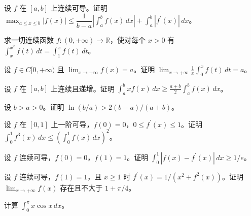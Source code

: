 \newpage
\noindent\begin{minipage}{\textwidth}
设 $f$ 在 $[a,b]$ 上连续可导。证明 $\max_{a\le x\le b}|f(x)|\le\dfrac1{b-a}|\int_a^b f(x)\,dx|+\int_a^b|f^{\prime}(x)|\,dx$。
\end{minipage}\par\vfill
\noindent\begin{minipage}{\textwidth}
求一切连续函数 $f:(0,+\infty)\to\mathbb R$，使对每个 $x>0$ 有 $\int_x^{x^2}f(t)\,dt=\int_1^x f(t)\,dt$。
\end{minipage}\par\vfill
\noindent\begin{minipage}{\textwidth}
设 $f\in C[0,+\infty)$ 且 $\lim_{x\to+\infty}f(x)=a$。证明 $\lim_{x\to+\infty}\frac1x\int_0^x f(t)\,dt=a$。
\end{minipage}\par\vfill
\newpage
\noindent\begin{minipage}{\textwidth}
设 $f$ 在 $[a,b]$ 上连续且递增。证明 $\int_a^b xf(x)\,dx\ge\frac{a+b}2\int_a^b f(x)\,dx$。
\end{minipage}\par\vfill
\noindent\begin{minipage}{\textwidth}
设 $b>a>0$。证明 $\ln(b/a)>2(b-a)/(a+b)$。
\end{minipage}\par\vfill
\noindent\begin{minipage}{\textwidth}
设 $f$ 在 $[0,1]$ 上一阶可导，$f(0)=0$，$0\le f^{\prime}(x)\le1$。证明 $\int_0^1f^3(x)\,dx\le(\int_0^1 f(x)\,dx)^2$。
\end{minipage}\par\vfill
\newpage
\noindent\begin{minipage}{\textwidth}
设 $f$ 连续可导，$f(0)=0$，$f(1)=1$。证明 $\int_0^1|f(x)-f^{\prime}(x)|\,dx\ge1/e$。
\end{minipage}\par\vfill
\noindent\begin{minipage}{\textwidth}
设 $f$ 连续可导，$f(1)=1$，且 $x\ge1$ 时 $f^{\prime}(x)=1/(x^2+f^2(x))$。证明 $\lim_{x\to+\infty}f(x)$ 存在且不大于 $1+\pi/4$。
\end{minipage}\par\vfill
\noindent\begin{minipage}{\textwidth}
计算 $\int_0^\pi x\cos x\,dx$。
\end{minipage}\par\vfill
